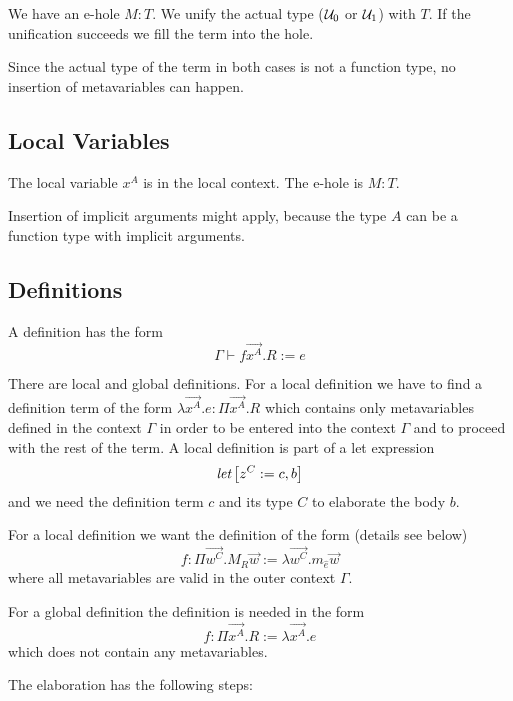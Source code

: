 We have an e-hole $M: T$. We unify the actual type (${\mathcal U}_0$ or ${\mathcal U}_1$) with
$T$. If the unification succeeds we fill the term into the hole.

Since the actual type of the term in both cases is not a function type, no
insertion of metavariables can happen.






\subsection{Local Variables}


The local variable $x^A$ is in the local context. The e-hole is $M: T$.

Insertion of implicit arguments might apply, because the type $A$ can be a
function type with implicit arguments.




\subsection{Definitions}


A definition has the form
$$
    \Gamma \vdash f \vec {x^A}. R := e
$$

There are local and global definitions. For a local definition we have to find a
definition term of the form $\lambda \vec {x^A}. e: \Pi \vec{x^A}. R$ which
contains only metavariables defined in the context $\Gamma$ in order to be
entered into the context $\Gamma$ and to proceed with the rest of the term.
A local definition is part of a let expression
$$
    {{\text{\it let}} \left[ {z^C := c, b} \right]}
$$
and we need the definition term $c$ and its type $C$ to elaborate the body $b$.

For a local definition we want the definition of the form (details see below)
$$
    f
    :
    \Pi \vec {w^C}. M_R \vec w
    :=
    \lambda \vec{w^C}. m_{\hat e} \vec w
$$
where all metavariables are valid in the outer context $\Gamma$.

For a global definition the definition is needed in the form
$$
    f: \Pi \vec{x^A} . R := \lambda \vec {x^A}. e
$$
which does not contain any metavariables.



The elaboration has the following steps:

